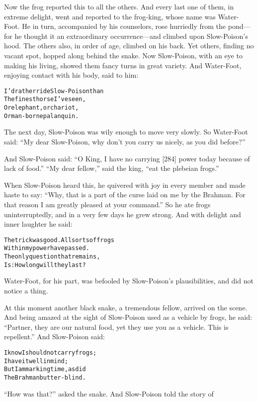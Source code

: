 \documentclass{article}
\renewenvironment{verbatim}{\begin{alltt}\normalfont\begin{centering}}{\end{centering}\end{alltt}}
\begin{document}
Now the frog reported this to all the others. And every last one of
them, in extreme delight, went and reported to the frog-king, whose
name was Water-Foot. He in turn, accompanied by his counselors,
rose hurriedly from the pond---for he thought it an extraordinary
occurrence---and climbed upon Slow-Poison's hood. The others also,
in order of age, climbed on his back. Yet others, finding no vacant
spot, hopped along behind the snake. Now Slow-Poison, with an eye
to making his living, showed them fancy turns in great variety. And
Water-Foot, enjoying contact with his body, said to him:

\begin{verbatim}
I'd rather ride Slow-Poison than
The finest horse I've seen,
Or elephant, or chariot,
Or man-borne palanquin.
\end{verbatim}
The next day, Slow-Poison was wily enough to move very slowly. So
Water-Foot said:
``My dear Slow-Poison, why don't you carry us nicely, as you did before?''

And Slow-Poison said:
``O King, I have no carrying [284] power today because of lack of food.''
``My dear fellow,'' said the king, ``eat the plebeian frogs.''

When Slow-Poison heard this, he quivered with joy in every member
and made haste to say:
``Why, that is a part of the curse laid on me by the Brahman. For that reason I am greatly pleased at your command.''
So he ate frogs uninterruptedly, and in a very few days he grew
strong. And with delight and inner laughter he said:

\begin{verbatim}
The trick was good. All sorts of frogs
    Within my power have passed.
The only question that remains,
    Is: How long will they last?
\end{verbatim}
Water-Foot, for his part, was befooled by Slow-Poison's
plausibilities, and did not notice a thing.

At this moment another black snake, a tremendous fellow, arrived on
the scene. And being amazed at the sight of Slow-Poison used as a
vehicle by frogs, he said:
``Partner, they are our natural food, yet they use you as a vehicle. This is repellent.''
And Slow-Poison said:

\begin{verbatim}
I know I should not carry frogs;
    I have it well in mind;
But I am marking time, as did
    The Brahman butter-blind.
\end{verbatim}
``How was that?'' asked the snake. And Slow-Poison told the story
of
\end{document}
